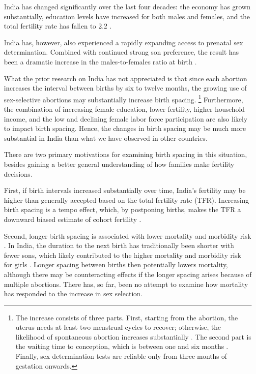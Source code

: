 \documentclass[12pt,letterpaper]{article}
\begin{document}
\raggedright


India has changed significantly over the last four decades:
the economy has grown substantially,
education levels have increased for both males and females,
and the total fertility rate has fallen to 2.2 
\citep{Bosworth2008,Dharmalingam2014,
International-Institute-for-Population-Sciences-IIPS2017}.

India has, however, also experienced a rapidly expanding 
access to prenatal sex determination.
Combined with continued strong son preference, the result has been a dramatic 
increase in the males-to-females ratio at birth
\citep{das_gupta97,Arnold2002,retherford03b,Guilmoto2012,
Portner2015b,Jayachandran2017}.

What the prior research on India has not appreciated is that since each abortion 
increases the interval between births by six to twelve months, the growing use of 
sex-selective abortions may substantially increase birth spacing.%
\footnote{
The increase consists of three parts.
First, starting from the abortion, the uterus needs at 
least two menstrual cycles to recover;  otherwise, the likelihood 
of spontaneous abortion increases substantially \citep{zhou00b}.
The second part is the waiting time to conception, which is between 
one and six months \citep{Wang2003}.
Finally, sex determination tests are reliable only from three months 
of gestation onwards.
}
Furthermore, the combination of increasing female education, 
lower fertility, higher household income, and the low and declining female 
labor force participation are also likely to impact birth spacing.
Hence, the changes in birth spacing may be much more substantial in India 
than what we have observed in other countries.

There are two primary motivations for examining birth spacing in this
situation, besides gaining a better general understanding of how
families make fertility decisions.


First, if birth intervals increased substantially over time, India's fertility may 
be higher than generally accepted based on the total fertility rate (TFR).
Increasing birth spacing is a tempo effect, which, by postponing births, makes the TFR a 
downward biased estimate of cohort fertility 
\citep{Hotz1997,Bongaarts1999,Ni-Bhrolchain2011}.

Second, longer birth spacing is associated with lower mortality and 
morbidity risk \citep{Conde-Agudelo2012,Molitoris2019}.
In India, the duration to the next birth has traditionally been shorter with fewer sons, 
which likely contributed to the higher mortality and morbidity risk for girls
\citep{Whitworth2002,Bhalotra2008,Maitra2008,Jayachandran2011,Jayachandran2017a}.
Longer spacing between births then potentially lowers mortality, although there may
be counteracting effects if the longer spacing arises because of multiple abortions.
There has, so far, been no attempt to examine how mortality has responded to the
increase in sex selection.
\end{document}
